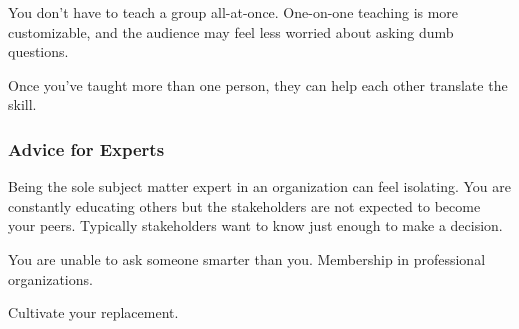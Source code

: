 You don't have to teach a group all-at-once. One-on-one teaching is more customizable, and the audience may feel less worried about asking dumb questions.

Once you've taught more than one person, they can help each other translate the skill. 



\subsubsection*{Advice for Experts}

Being the sole subject matter expert in an organization can feel isolating. You are constantly educating others but the stakeholders are not expected to become your peers. Typically stakeholders want to know just enough to make a decision. 

You are unable to ask someone smarter than you. Membership in professional organizations.

Cultivate your replacement. 
